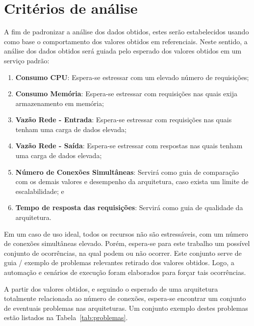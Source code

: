 \section{Critérios de análise}
\label{sec:criterios}

A fim de padronizar a análise dos dados obtidos, estes serão estabelecidos usando como base o comportamento dos valores obtidos em referenciais.
%
Neste sentido, a análise dos dados obtidos será guiada pelo esperado dos valores obtidos em um serviço padrão:

\begin{enumerate}
  \item \textbf{Consumo CPU}: Espera-se estressar com um elevado número de requisições;
  \item \textbf{Consumo Memória}: Espera-se estressar com requisições nas quais exija armazenamento em memória;
  \item \textbf{Vazão Rede - Entrada}: Espera-se estressar com requisições nas quais tenham uma carga de dados elevada;
  \item \textbf{Vazão Rede - Saída}: Espera-se estressar com respostas nas quais tenham uma carga de dados elevada;
  \item \textbf{Número de Conexões Simultâneas}: Servirá como guia de comparação com os demais valores e desempenho da arquitetura, caso exista um limite de escalabilidade; e
  \item \textbf{Tempo de resposta das requisições}: Servirá como guia de qualidade da arquitetura.
\end{enumerate}

Em um caso de uso ideal, todos os recursos não são estressáveis, com um número de conexões simultâneas elevado.
%
Porém, espera-se para este trabalho um possível conjunto de ocorrências, na qual podem ou não ocorrer.
%
Este conjunto serve de guia / exemplo de problemas relevantes retirado dos valores obtidos.
%
Logo, a automação e cenários de execução foram elaborados para forçar tais ocorrências.


A partir dos valores obtidos, e seguindo o esperado de uma arquitetura totalmente relacionada ao número de conexões, espera-se encontrar um conjunto de eventuais problemas nas arquiteturas.
%
Um conjunto exemplo destes problemas estão listados na Tabela~\ref{tab:problemas}.
\pagebreak


